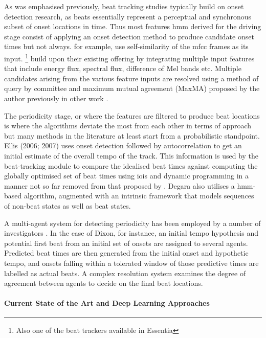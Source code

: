 {As was emphasised previously, beat tracking studies typically build on onset detection research, as beats essentially represent a perceptual and synchronous subset of onset locations in time. Thus most features \acrshort{hmm} derived for the driving stage consist of applying an onset detection method to produce candidate onset times \citep{Brossier2006, Dixon2006, Ellis2007a, Degara2012, Zapata2014} but not always. \cite{antonopoulos2007self} for example, use self-similarity of the \acrshort{mfcc} frames as its input. \cite{Degara2012}\footnote{Also one of the beat trackers available in Essentia} build upon their existing offering by integrating multiple input features that include energy flux, spectral flux, difference of Mel bands etc. Multiple candidates arising from the various feature inputs are resolved using a method of query by committee and maximum mutual agreement (MaxMA) proposed by the author previously in other work \citep{Zapata2012, Zapata2014}.

The periodicity stage, or where the features are filtered to produce beat locations is where the algorithms deviate the most from each other in terms of approach but many methods in the literature at least start from a probabilistic standpoint. Ellis (2006; 2007) uses onset detection followed by autocorrelation to get an initial estimate of the overall tempo of the track. This information is used by the beat-tracking module to compare the idealised beat times against computing the globally optimised set of beat times using \acrshort{ioi}s and dynamic programming in a manner not so far removed from that proposed by \cite{Alonso2007}. Degara also utilises a \acrshort{hmm}-based algorithm, augmented with an intrinsic framework that models sequences of non-beat states as well as beat states.

A multi-agent system for detecting periodicity has been employed by a number of investigators \citep{Goto2001a, Dixon2007, Oliveira2012}. In the case of Dixon, for instance, an initial tempo hypothesis and potential first beat from an initial set of onsets are assigned to several agents. Predicted beat times are then generated from the initial onset and hypothetic tempo, and onsets falling within a tolerated window of those predictive times are labelled as actual beats. A complex resolution system examines the degree of agreement between agents to decide on the final beat locations.

\paragraph{Current State of the Art and Deep Learning Approaches}

}
